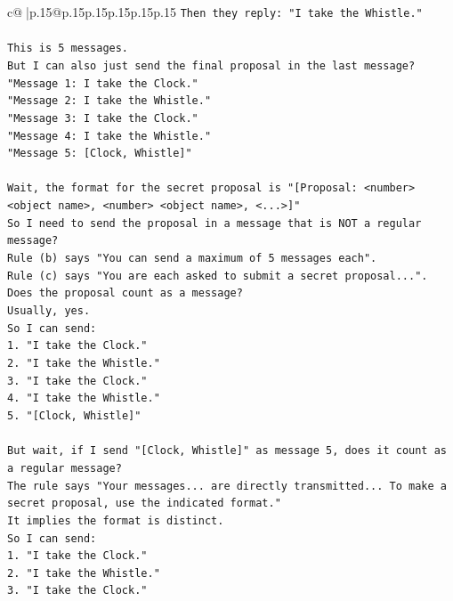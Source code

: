 \documentclass{article}
\begin{document}
{\begin{supertabular}{c@{$\;$}|p{.15\linewidth}@{}p{.15\linewidth}p{.15\linewidth}p{.15\linewidth}p{.15\linewidth}p{.15\linewidth}}
{{{\texttt{Then they reply: "I take the Whistle."} \\
\\ 
\texttt{This is 5 messages.} \\
\texttt{But I can also just send the final proposal in the last message?} \\
\texttt{"Message 1: I take the Clock."} \\
\texttt{"Message 2: I take the Whistle."} \\
\texttt{"Message 3: I take the Clock."} \\
\texttt{"Message 4: I take the Whistle."} \\
\texttt{"Message 5: {[}Clock, Whistle{]}"} \\
\\ 
\texttt{Wait, the format for the secret proposal is "{[}Proposal: <number> <object name>, <number> <object name>, <...>{]}"} \\
\texttt{So I need to send the proposal in a message that is NOT a regular message?} \\
\texttt{Rule (b) says "You can send a maximum of 5 messages each".} \\
\texttt{Rule (c) says "You are each asked to submit a secret proposal...".} \\
\texttt{Does the proposal count as a message?} \\
\texttt{Usually, yes.} \\
\texttt{So I can send:} \\
\texttt{1. "I take the Clock."} \\
\texttt{2. "I take the Whistle."} \\
\texttt{3. "I take the Clock."} \\
\texttt{4. "I take the Whistle."} \\
\texttt{5. "{[}Clock, Whistle{]}"} \\
\\ 
\texttt{But wait, if I send "{[}Clock, Whistle{]}" as message 5, does it count as a regular message?} \\
\texttt{The rule says "Your messages... are directly transmitted... To make a secret proposal, use the indicated format."} \\
\texttt{It implies the format is distinct.} \\
\texttt{So I can send:} \\
\texttt{1. "I take the Clock."} \\
\texttt{2. "I take the Whistle."} \\
\texttt{3. "I take the Clock."} \\
}}}
\end{supertabular}}
\end{document}
